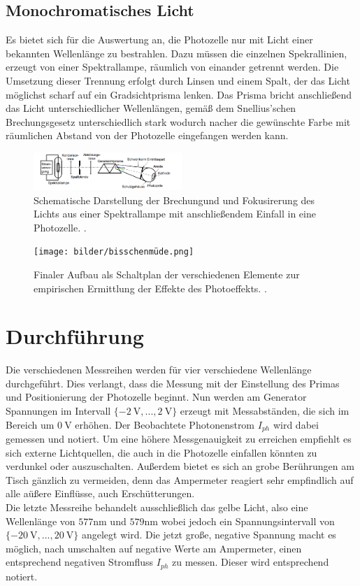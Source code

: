 \subsection{Monochromatisches Licht}
Es bietet sich für die Auswertung an, die Photozelle nur mit Licht einer bekannten Wellenlänge zu bestrahlen.
Dazu müssen die einzelnen Spekrallinien, erzeugt von einer Spektrallampe, räumlich von einander getrennt werden. 
Die Umsetzung dieser Trennung erfolgt durch Linsen und einem Spalt, der das Licht möglichst scharf auf ein Gradsichtprisma lenken.
Das Prisma bricht anschließend das Licht unterschiedlicher Wellenlängen, gemäß dem Snellius'schen Brechungsgesetz unterschiedlich 
stark wodurch nacher die gewünschte Farbe mit räumlichen Abstand von der Photozelle eingefangen werden kann.
\begin{figure}
    \centering
    \includegraphics[width=0.5\textwidth]{bilder/licht.png}
    \caption{Schematische Darstellung der Brechungund und Fokusirerung des Lichts aus einer Spektrallampe mit anschließendem Einfall in eine Photozelle. \cite{skript}.} 
    \label{fig:müde}
\end{figure}

\begin{figure}
    \centering
    \texttt{[image: bilder/bisschenmüde.png]}
    \caption{Finaler Aufbau als Schaltplan der verschiedenen Elemente zur empirischen Ermittlung der Effekte des Photoeffekts. \cite{skript}.} 
    \label{fig:müde}
\end{figure}
\section{Durchführung}
Die verschiedenen Messreihen werden für vier verschiedene Wellenlänge durchgeführt. %
Dies verlangt, dass die Messung mit der Einstellung des Primas und Positionierung der Photozelle beginnt. 
Nun werden am Generator Spannungen im Intervall $\{\SI{-2}{\volt},... ,\SI{2}{\volt}\}$ erzeugt mit Messabständen, die sich im Bereich um $\SI{0}{\volt}$ erhöhen.
Der Beobachtete Photonenstrom $I_{ph}$ wird dabei gemessen und notiert. Um eine höhere Messgenauigkeit zu erreichen empfiehlt es sich externe Lichtquellen, die
auch in die Photozelle einfallen könnten zu verdunkel oder auszuschalten. Außerdem bietet es sich an grobe Berührungen am Tisch gänzlich zu vermeiden, 
denn das Ampermeter reagiert sehr empfindlich auf alle aüßere Einflüsse, auch Erschütterungen.
\\
\newline
Die letzte Messreihe behandelt ausschließlich das gelbe Licht, also eine Wellenlänge von $577\si{\nano\meter}$ und $579 \si{\nano\meter}$ wobei jedoch ein 
Spannungsintervall von $\{\SI{-20}{\volt},... ,\SI{20}{\volt}\}$ angelegt wird. Die jetzt große, negative Spannung macht es möglich, nach umschalten auf negative Werte am Ampermeter,
einen entsprechend negativen Stromfluss $I_{ph}$ zu messen. Dieser wird entsprechend notiert. 
